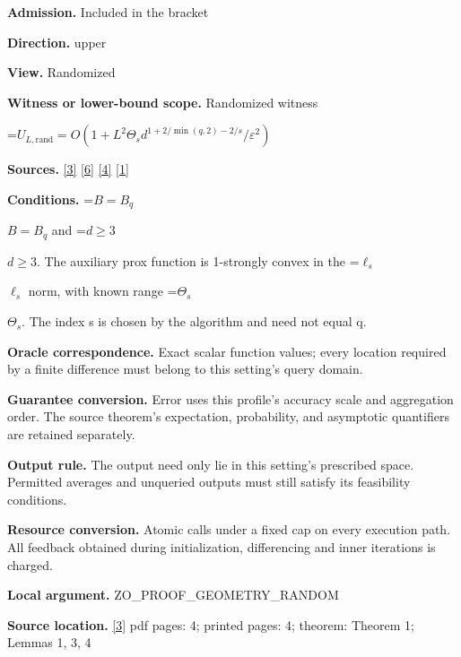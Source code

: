 \documentclass[10pt,a4paper]{article}
\newcommand{\AtlasMath}[1]{\par\begingroup\centering\setbox0=\hbox{$\displaystyle #1$}\ifdim\wd0>1.4\linewidth\typeout{ATLAS WIDE FORMULA: \the\wd0}\fi\ifdim\wd0>\linewidth\resizebox{\linewidth}{!}{\box0}\else\box0\fi\par\endgroup}
\newcommand{\AtlasInlineMath}[1]{\begingroup\setbox0=\hbox{$#1$}\ifdim\wd0>.4\linewidth\endgroup\AtlasMath{#1}\else\endgroup$#1$\fi}
\begin{document}
\textbf{Admission.} Included in the bracket



\textbf{Direction.} upper



\textbf{View.} Randomized



\textbf{Witness or lower-bound scope.} Randomized witness



\AtlasMath{U_{L,\mathrm{rand}}=O(1+L^2\Theta_s d^{1+2/\min(q,2)-2/s}/\varepsilon^2)}


\textbf{Sources.} \href{https://proceedings.neurips.cc/paper_files/paper/2022/file/329ef22fd8cb68223d5df09a037f7dd9-Paper-Conference.pdf}{[3]} \href{https://arxiv.org/abs/1802.09022}{[6]} \href{https://jmlr.org/papers/volume18/16-632/16-632.pdf}{[4]} \href{https://arxiv.org/html/2610.00345v1}{[1]}



\textbf{Conditions.} \AtlasInlineMath{B=B_q} and \AtlasInlineMath{d\ge3}. The auxiliary prox function is 1-strongly convex in the \AtlasInlineMath{\ell _s} norm, with known range \AtlasInlineMath{\Theta_s}. The index s is chosen by the algorithm and need not equal q.



\textbf{Oracle correspondence.} Exact scalar function values; every location required by a finite difference must belong to this setting's query domain.



\textbf{Guarantee conversion.} Error uses this profile's accuracy scale and aggregation order. The source theorem's expectation, probability, and asymptotic quantifiers are retained separately.



\textbf{Output rule.} The output need only lie in this setting's prescribed space. Permitted averages and unqueried outputs must still satisfy its feasibility conditions.



\textbf{Resource conversion.} Atomic calls under a fixed cap on every execution path. All feedback obtained during initialization, differencing and inner iterations is charged.



\textbf{Local argument.} ZO\_PROOF\_GEOMETRY\_RANDOM



\textbf{Source location.} \href{https://proceedings.neurips.cc/paper_files/paper/2022/file/329ef22fd8cb68223d5df09a037f7dd9-Paper-Conference.pdf}{[3]} pdf pages: 4; printed pages: 4; theorem: Theorem 1; Lemmas 1, 3, 4
\end{document}
